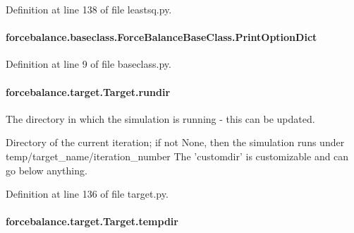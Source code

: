 Definition at line 138 of file leastsq.\-py.

\hypertarget{classforcebalance_1_1baseclass_1_1ForceBalanceBaseClass_a5c55e661e746d1a4443f4e0bc34ebe05}{
\paragraph[{Print\-Option\-Dict}]{\setlength{\rightskip}{0pt plus 5cm}forcebalance.\-baseclass.\-Force\-Balance\-Base\-Class.\-Print\-Option\-Dict\hspace{0.3cm}{\ttfamily [inherited]}}}\label{classforcebalance_1_1baseclass_1_1ForceBalanceBaseClass_a5c55e661e746d1a4443f4e0bc34ebe05}


Definition at line 9 of file baseclass.\-py.

\hypertarget{classforcebalance_1_1target_1_1Target_a6872de5b2d4273b82336ea5b0da29c9e}{
\paragraph[{rundir}]{\setlength{\rightskip}{0pt plus 5cm}forcebalance.\-target.\-Target.\-rundir\hspace{0.3cm}{\ttfamily [inherited]}}}\label{classforcebalance_1_1target_1_1Target_a6872de5b2d4273b82336ea5b0da29c9e}


The directory in which the simulation is running -\/ this can be updated. 

Directory of the current iteration; if not None, then the simulation runs under temp/target\-\_\-name/iteration\-\_\-number The 'customdir' is customizable and can go below anything.

Definition at line 136 of file target.\-py.

\hypertarget{classforcebalance_1_1target_1_1Target_aa1f01b5b78db253b5b66384ed11ed193}{
\paragraph[{tempdir}]{\setlength{\rightskip}{0pt plus 5cm}forcebalance.\-target.\-Target.\-tempdir\hspace{0.3cm}{\ttfamily [inherited]}}}\label{classforcebalance_1_1target_1_1Target_aa1f01b5b78db253b5b66384ed11ed193}


